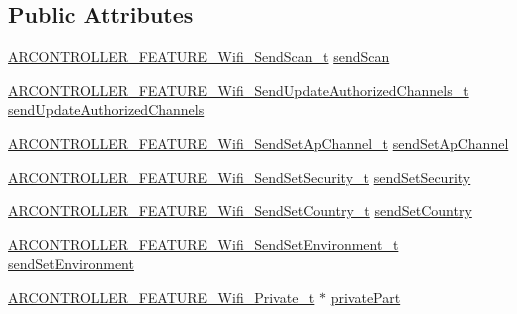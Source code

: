 \subsection*{Public Attributes}
\begin{DoxyCompactItemize}
\item 
\hyperlink{_a_r_c_o_n_t_r_o_l_l_e_r___feature_8h_a8d0ccf5c2ba7c77e9d00244fe6c144f8}{A\+R\+C\+O\+N\+T\+R\+O\+L\+L\+E\+R\+\_\+\+F\+E\+A\+T\+U\+R\+E\+\_\+\+Wifi\+\_\+\+Send\+Scan\+\_\+t} \hyperlink{struct_a_r_c_o_n_t_r_o_l_l_e_r___f_e_a_t_u_r_e___wifi__t_a5be1aa4c321981af6d966a05fa909acb}{send\+Scan}
\item 
\hyperlink{_a_r_c_o_n_t_r_o_l_l_e_r___feature_8h_afc6a6de01233739202e18708d2ca0278}{A\+R\+C\+O\+N\+T\+R\+O\+L\+L\+E\+R\+\_\+\+F\+E\+A\+T\+U\+R\+E\+\_\+\+Wifi\+\_\+\+Send\+Update\+Authorized\+Channels\+\_\+t} \hyperlink{struct_a_r_c_o_n_t_r_o_l_l_e_r___f_e_a_t_u_r_e___wifi__t_a16f3c3e9136ba97169631bdba2f10732}{send\+Update\+Authorized\+Channels}
\item 
\hyperlink{_a_r_c_o_n_t_r_o_l_l_e_r___feature_8h_afdf91ba9522299d00c3388f67b64087b}{A\+R\+C\+O\+N\+T\+R\+O\+L\+L\+E\+R\+\_\+\+F\+E\+A\+T\+U\+R\+E\+\_\+\+Wifi\+\_\+\+Send\+Set\+Ap\+Channel\+\_\+t} \hyperlink{struct_a_r_c_o_n_t_r_o_l_l_e_r___f_e_a_t_u_r_e___wifi__t_a889dcc9119b11e2f1a09228b146ad7d7}{send\+Set\+Ap\+Channel}
\item 
\hyperlink{_a_r_c_o_n_t_r_o_l_l_e_r___feature_8h_ab5b45f5335f76353107c92fb5c70631d}{A\+R\+C\+O\+N\+T\+R\+O\+L\+L\+E\+R\+\_\+\+F\+E\+A\+T\+U\+R\+E\+\_\+\+Wifi\+\_\+\+Send\+Set\+Security\+\_\+t} \hyperlink{struct_a_r_c_o_n_t_r_o_l_l_e_r___f_e_a_t_u_r_e___wifi__t_a8c4bd99bff0b6e696ec41c55637fc2ab}{send\+Set\+Security}
\item 
\hyperlink{_a_r_c_o_n_t_r_o_l_l_e_r___feature_8h_aa40e3cb9ee76420c2121ce0b632a10f2}{A\+R\+C\+O\+N\+T\+R\+O\+L\+L\+E\+R\+\_\+\+F\+E\+A\+T\+U\+R\+E\+\_\+\+Wifi\+\_\+\+Send\+Set\+Country\+\_\+t} \hyperlink{struct_a_r_c_o_n_t_r_o_l_l_e_r___f_e_a_t_u_r_e___wifi__t_ac2ce67ac9f66ce540af8c95d83ece856}{send\+Set\+Country}
\item 
\hyperlink{_a_r_c_o_n_t_r_o_l_l_e_r___feature_8h_ae3dac417d061563c9730857d52f6ffcf}{A\+R\+C\+O\+N\+T\+R\+O\+L\+L\+E\+R\+\_\+\+F\+E\+A\+T\+U\+R\+E\+\_\+\+Wifi\+\_\+\+Send\+Set\+Environment\+\_\+t} \hyperlink{struct_a_r_c_o_n_t_r_o_l_l_e_r___f_e_a_t_u_r_e___wifi__t_ae406905af6e09f010d2d0a275b43c285}{send\+Set\+Environment}
\item 
\hyperlink{_a_r_c_o_n_t_r_o_l_l_e_r___feature_8h_a77370d71f834db43f733830b678e8916}{A\+R\+C\+O\+N\+T\+R\+O\+L\+L\+E\+R\+\_\+\+F\+E\+A\+T\+U\+R\+E\+\_\+\+Wifi\+\_\+\+Private\+\_\+t} $\ast$ \hyperlink{struct_a_r_c_o_n_t_r_o_l_l_e_r___f_e_a_t_u_r_e___wifi__t_a941252e16692b678ad75989bab9daae0}{private\+Part}
\end{DoxyCompactItemize}



